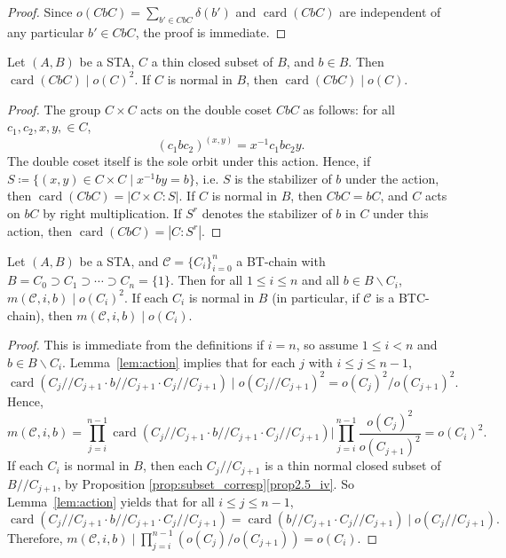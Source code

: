 \documentclass[ALCO,ThmDefs,Unicode,epreuves]{cedram}
\DeclareMathOperator{\card}{card}
\begin{document}
\begin{proof}
Since $o(CbC) = \sum_{b' \in CbC}\delta(b')$ and $\card(CbC)$ are
independent of any particular $b' \in CbC$, the proof is immediate.
\end{proof}

\begin{lemm}
\label{lem:action}
Let $(A, B)$ be a STA, $C$ a thin closed subset of $B$, and $b \in B$.
Then $\card (CbC) \mid o(C)^2$. If $C$ is normal in $B$, then
$\card(CbC) \mid o(C)$.
\end{lemm}

\begin{proof}
The group $C\times C$ acts on the double coset $CbC$ as follows: for
all $c_1, c_2, x, y, \in C$,
\[
(c_1bc_2)^{(x, y)} = x^{-1}c_1bc_2y.
\]
The double coset itself is the sole orbit under this action. Hence, if
$S \coloneqq \{(x, y) \in C\times C \mid x^{-1}by = b\}$, i.e. $S$ is the
stabilizer of $b$ under the action, then $\card (CbC) = |C\times C
: S|$. If $C$ is normal in $B$, then $CbC = bC$, and $C$ acts on $bC$ by
right multiplication. If $S^r$ denotes the stabilizer of $b$ in $C$
under this action, then $\card (CbC) = |C : S^r|$.
\end{proof}
 
\begin{lemm}
\label{lem:m_sq}
Let $(A, B)$ be a STA, and $\mathcal{C} = \{C_i\}_{i=0}^n$ a BT-chain
with $B = C_0 \supset C_1 \supset \cdots \supset C_n = \{1\}$. Then for
all $1 \leq i \leq n$ and all $b \in B\backslash C_i$, $m(\mathcal{C},
i, b) \mid o(C_i)^2$. If each $C_i$ is normal in $B$ \textup{(}in
particular, if $\mathcal{C}$ is a BTC-chain\textup{)}, then $m(\mathcal{C}, i, b)
\mid o(C_i)$.
\end{lemm}

\begin{proof}
This is immediate from the definitions if $i = n$, so assume $1 \leq i
< n$ and $b \in B\backslash C_i$. Lemma~\ref{lem:action} implies that
for each $j$ with $i \leq j \leq n-1$, 
\[
 \card (C_j//C_{j+1}\cdot b//C_{j+1}\cdot C_j//C_{j+1}) \mid
o(C_j//C_{j+1})^2 = o(C_j)^2/o(C_{j+1})^2.
\]
Hence,
\[
m(\mathcal{C}, i, b) = \prod_{j=i}^{n-1}\card (C_j//C_{j+1}\cdot
b//C_{j+1}\cdot C_j//C_{j+1}) \mathrel{\bigg|}
\prod_{j=i}^{n-1}\frac{o(C_j)^2}{o(C_{j+1})^2} = o(C_i)^2.
\]
If each $C_i$ is normal in $B$, then each $C_j//C_{j+1}$ is a thin
normal closed subset of $B//C_{j+1}$, by Proposition
\ref{prop:subset_corresp}\ref{prop2.5_iv}. So Lemma~\ref{lem:action} yields that 
for all $i \leq j \leq n-1$, 
\[
\card (C_j//C_{j+1}\cdot b//C_{j+1}\cdot C_j//C_{j+1}) =
\card (b//C_{j+1}\cdot C_j//C_{j+1}) \mid o(C_j//C_{j+1}).
\]
Therefore, $m(\mathcal{C}, i, b) \mid
\prod_{j=i}^{n-1}(o(C_j)/o(C_{j+1})) = o(C_i)$.
\end{proof}
\end{document}
